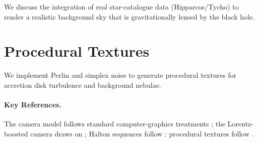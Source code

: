 We discuss the integration of real star-catalogue data (Hipparcos/Tycho) to
render a realistic background sky that is gravitationally lensed by the black
hole.

\section{Procedural Textures\starmark{}}
\label{sec:cam-textures}

We implement Perlin and simplex noise to generate procedural textures for
accretion disk turbulence and background nebulae.

\paragraph{Key References.}
The camera model follows standard computer-graphics treatments
\cite{Marschner2016}; the Lorentz-boosted camera draws on \cite{James2015};
Halton sequences follow \cite{Halton1964}; procedural textures follow
\cite{Perlin1985}.
